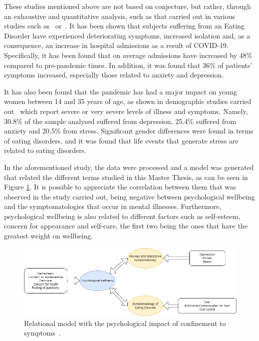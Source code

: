 These studies mentioned above are not based on conjecture, but rather, through an exhaustive and quantitative analysis, such as that carried out in various studies such as~\cite{j2022impact} or~\cite{vall2021impacto}. It has been shown that subjects suffering from an Eating Disorder have experienced deteriorating symptoms, increased isolation and, as a consequence, an increase in hospital admissions as a result of COVID-19. Specifically, it has been found that on average admissions have increased by 48\% compared to pre-pandemic times. In addition, it was found that 36\% of patients' symptoms increased, especially those related to anxiety and depression.

It has also been found that the pandemic has had a major impact on young women between 14 and 35 years of age, as shown in demographic studies carried out~\cite{vall2021impacto} which report severe or very severe levels of illness and symptoms. Namely, 30.8\% of the sample analysed suffered from depression, 25.4\% suffered from anxiety and 20.5\% from stress. Significant gender differences were found in terms of eating disorders, and it was found that life events that generate stress are related to eating disorders.

In the aforementioned study, the data were processed and a model was generated that related the different terms studied in this Master Thesis, as can be seen in Figure \ref{fig:vall_diagram}. It is possible to appreciate the correlation between them that was observed in the study carried out, being negative between psychological wellbeing and the symptomatologies that occur in mental illnesses. Furthermore, psychological wellbeing is also related to different factors such as self-esteem, concern for appearance and self-care, the first two being the ones that have the greatest weight on wellbeing.

\begin{figure}[!htp]
    \centering
    \includegraphics[scale=0.53]{img/introduction/vall_diagram.png}
    \caption{Relational model with the psychological impact of confinement to symptoms~\cite{vall2021impacto}.}
    \label{fig:vall_diagram}
\end{figure}



